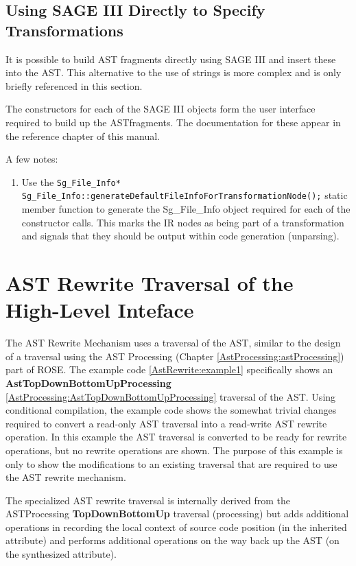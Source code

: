 \subsection{Using SAGE III Directly to Specify Transformations}

   It is possible to build AST fragments directly using SAGE III and insert these into
the AST.  This alternative to the use of strings is more complex and is only
briefly referenced in this section.

   The constructors for each of the SAGE III objects form the user interface required to
build up the ASTfragments.  The documentation for these appear in the reference chapter
of this manual.

A few notes:
\begin{enumerate}
 \item Use the {\tt Sg\_File\_Info* Sg\_File\_Info::generateDefaultFileInfoForTransformationNode();} 
static member function to generate the Sg\_File\_Info object required for each of the
constructor calls.  This marks the IR nodes as being part of a transformation and signals
that they should be output within code generation (unparsing).
\end{enumerate}


\section{AST Rewrite Traversal of the High-Level Inteface}

    The AST Rewrite Mechanism uses a traversal of the AST, similar to the
design of a traversal using the AST Processing 
(Chapter \ref{AstProcessing:astProcessing}) part of ROSE.
The example code \ref{AstRewrite:example1} specifically shows an {\bf AstTopDownBottomUpProcessing}
\ref{AstProcessing:AstTopDownBottomUpProcessing}
traversal of the AST.  Using conditional compilation,
the example code shows the somewhat trivial changes required to convert
a read-only AST traversal into a read-write AST rewrite operation. In this
example the AST traversal is converted to be ready for rewrite operations, but
no rewrite operations are shown. The purpose of this example is only to show the
modifications to an existing traversal that are required to use the AST rewrite
mechanism.

   The specialized AST rewrite traversal is internally derived from the ASTProcessing
{\bf TopDownBottomUp} traversal (processing) but adds additional operations
in recording the local context of source code position (in the inherited attribute)
and performs additional operations on the way back up the AST (on the synthesized attribute).

